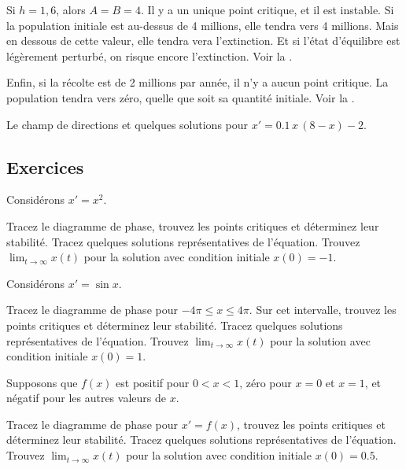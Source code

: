 Si $h = 1,6$, alors $A=B=4$.  Il y a un unique point critique, et il est instable.
Si la population initiale est au-dessus de 4 millions, elle tendra vers 4 millions.
Mais en dessous de cette valeur, elle tendra vera l'extinction.
Et si l'état d'équilibre est légèrement perturbé, on risque encore l'extinction. Voir la .

Enfin, si la récolte est de 2 millions par année, il n'y a aucun point critique.
La population tendra vers zéro, quelle que soit sa quantité initiale.  Voir la .

\begin{myfig}
	\capstart {}
	\caption{Le champ de directions et quelques solutions pour
	$x' = 0.1\,x\,(8-x)-2$.\label{2.2:harv2}}
\end{myfig}


\subsection{Exercices}

\begin{samepage}
\begin{exercise}
	Considérons $x' = x^2$.
	\begin{tasks}
		\task Tracez le diagramme de phase, trouvez les points critiques et déterminez leur stabilité.
		\task Tracez quelques solutions représentatives de l'équation.
		\task Trouvez $\displaystyle \lim_{t\to \infty} x(t)$ pour la solution avec condition initiale 	$x(0) = -1$.
	\end{tasks}
\end{exercise}
\end{samepage}

\begin{exercise}
	Considérons $x' = \sin x$.
	\begin{tasks}
		\task Tracez le diagramme de phase pour $-4\pi \leq x \leq 4\pi$.  Sur cet intervalle, trouvez les points critiques et déterminez leur stabilité.
		\task Tracez quelques solutions représentatives de l'équation.
		\task Trouvez $\displaystyle \lim_{t\to \infty} x(t)$ pour la solution avec condition initiale  $x(0) = 1$.
	\end{tasks}
\end{exercise}

\begin{exercise}
	Supposons que $f(x)$ est positif pour $0 < x < 1$, zéro pour $x=0$ et $x=1$,
	et négatif pour les autres valeurs de $x$.
	\begin{tasks}
		\task Tracez le diagramme de phase pour $x' = f(x)$, trouvez les points critiques et déterminez leur stabilité.
		\task Tracez quelques solutions représentatives de l'équation.
		\task Trouvez $\displaystyle \lim_{t\to \infty} x(t)$ pour la solution avec condition initiale $x(0) = 0.5$.
	\end{tasks}
\end{exercise}

